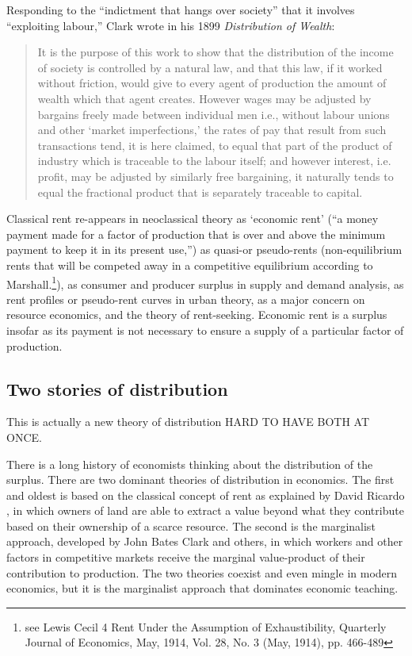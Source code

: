  Responding to the ``indictment that hangs over society'' that it involves ``exploiting labour,'' Clark wrote in his 1899 \textit{Distribution of Wealth}:
\begin{quotation}
 It is the purpose of this work to show that the distribution of the income of society is controlled by a natural law, and that this law, if it worked without friction, would give to every agent of production the amount of wealth which that agent creates. However wages may be adjusted by bargains freely made between individual men i.e., without labour unions and other `market imperfections,' the rates of pay that result from such transactions tend, it is here claimed, to equal that part of the product of industry which is traceable to the labour itself; and however interest, i.e. profit, may be adjusted by similarly free bargaining, it naturally tends to equal the fractional product that is separately traceable to capital. 
\end{quotation}

Classical rent re-appears in neoclassical theory as `economic rent' (``a money payment made for a factor of production that is over and above the minimum payment to keep it in its present use,'')  as quasi-or pseudo-rents (non-equilibrium rents that will be competed away in a competitive equilibrium according to Marshall.\footnote{see Lewis Cecil 4 Rent Under the Assumption of Exhaustibility, Quarterly Journal of Economics, May, 1914, Vol. 28, No. 3 (May, 1914), pp. 466-489}),  as consumer  and producer surplus in supply and demand analysis,  as rent profiles or \gls{pseudo-rent} curves in urban theory, as a major concern on resource economics, and the theory of rent-seeking. Economic rent is a surplus insofar as its payment is not necessary to ensure a supply of a particular factor of production. 




\subsection{Two stories of distribution}
This is actually a new theory of distribution
HARD TO HAVE BOTH AT ONCE.

There is a long history of economists thinking about the distribution of the surplus. %
There are two dominant theories of \gls{distribution} in economics. The first and oldest is based on the classical concept of rent as explained  by David Ricardo \cite{ricardoEssayInfluenceLow1815}, in which owners of land are able to extract a value beyond what they contribute based on their ownership of a scarce resource. The second is the marginalist approach, developed by John Bates Clark and others, in which workers and other factors  in competitive markets receive the \gls{marginal value-product} of their contribution to production. The two theories coexist and even mingle in modern economics, but it is the marginalist approach that dominates economic teaching. 

